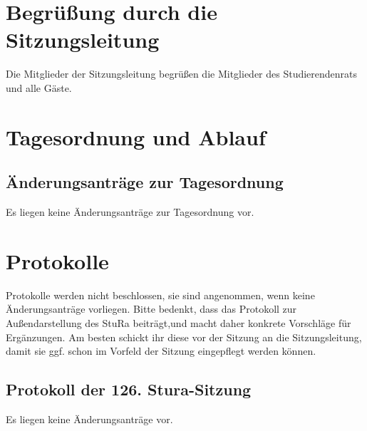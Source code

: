 \section{Begrüßung durch die Sitzungsleitung}
Die Mitglieder  der  Sitzungsleitung begrüßen die  Mitglieder  des  Studierendenrats  und  alle Gäste.

\section{Tagesordnung und Ablauf}
\hypersetup{linkcolor=black}%
\tableofcontents
\hypersetup{linkcolor=blue}%
\subsection{Änderungsanträge zur Tagesordnung}
Es liegen keine Änderungsanträge zur Tagesordnung vor.

\section{Protokolle}
Protokolle werden nicht beschlossen, sie sind angenommen, wenn keine Änderungsanträge vorliegen.
Bitte bedenkt, dass das Protokoll zur Außendarstellung des StuRa beiträgt,und macht daher konkrete Vorschläge
für Ergänzungen. Am besten schickt ihr diese vor der Sitzung an die Sitzungsleitung, damit sie ggf. schon im 
Vorfeld der Sitzung eingepflegt werden können.
\subsection{Protokoll der 126. Stura-Sitzung}
Es liegen keine Änderungsanträge vor.